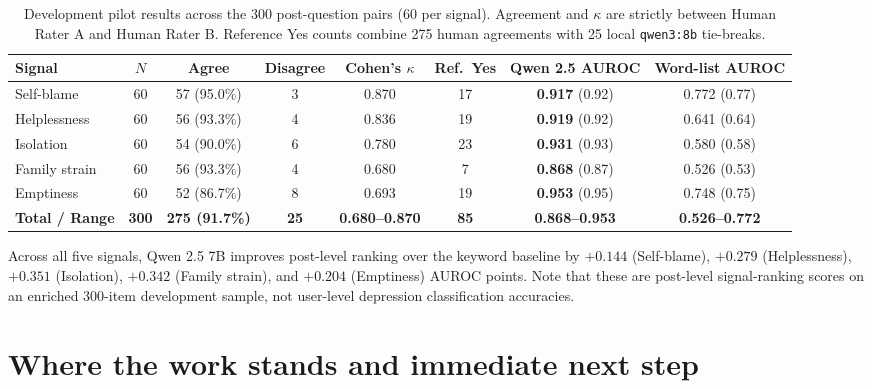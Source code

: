 \documentclass[11pt,a4paper]{article}
\begin{document}
\begin{table}[h]
\centering
\caption{Development pilot results across the 300 post-question pairs (60 per signal). Agreement and $\kappa$ are strictly between Human Rater A and Human Rater B. Reference Yes counts combine 275 human agreements with 25 local \texttt{qwen3:8b} tie-breaks.}
\label{tab:pilot_dev}
\begin{tabular}{lccccccc}
\toprule
\textbf{Signal} & \textbf{$N$} & \textbf{Agree} & \textbf{Disagree} & \textbf{Cohen's $\kappa$} & \textbf{Ref.\ Yes} & \textbf{Qwen 2.5 AUROC} & \textbf{Word-list AUROC} \\
\midrule
Self-blame & 60 & 57 (95.0\%) & 3 & 0.870 & 17 & \textbf{0.917} (0.92) & 0.772 (0.77) \\
Helplessness & 60 & 56 (93.3\%) & 4 & 0.836 & 19 & \textbf{0.919} (0.92) & 0.641 (0.64) \\
Isolation & 60 & 54 (90.0\%) & 6 & 0.780 & 23 & \textbf{0.931} (0.93) & 0.580 (0.58) \\
Family strain & 60 & 56 (93.3\%) & 4 & 0.680 & 7 & \textbf{0.868} (0.87) & 0.526 (0.53) \\
Emptiness & 60 & 52 (86.7\%) & 8 & 0.693 & 19 & \textbf{0.953} (0.95) & 0.748 (0.75) \\
\midrule
\textbf{Total / Range} & \textbf{300} & \textbf{275 (91.7\%)} & \textbf{25} & \textbf{0.680--0.870} & \textbf{85} & \textbf{0.868--0.953} & \textbf{0.526--0.772} \\
\bottomrule
\end{tabular}
\end{table}

Across all five signals, Qwen 2.5 7B improves post-level ranking over the keyword baseline by $+0.144$ (Self-blame), $+0.279$ (Helplessness), $+0.351$ (Isolation), $+0.342$ (Family strain), and $+0.204$ (Emptiness) AUROC points. Note that these are post-level signal-ranking scores on an enriched 300-item development sample, not user-level depression classification accuracies.

\section{Where the work stands and immediate next step}
\end{document}
